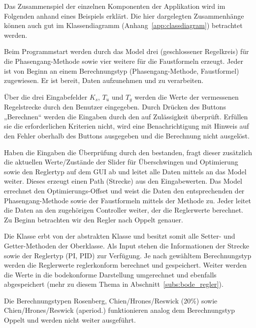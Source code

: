Das Zusammenspiel der einzelnen Komponenten  der Applikation wird im Folgenden
anhand  eines   Beispiels  erkl\"art. Die  hier   dargelegten  Zusammenh\"ange
k\"onnen   auch   gut   im   Klassendiagramm   (Anhang~\ref{app:classdiagram})
betrachtet werden.

Beim   Programmstart   werden   durch  das   Model   drei   
(geschlossener  Regelkreis) f\"ur  die Phasengang-Methode  sowie vier  weitere
f\"ur  die Faustformeln  erzeugt. Jeder   ist von  Beginn an
einem  Berechnungstyp  (Phasengang-Methode,  Faustformel)  zugewiesen. Er  ist
bereit, Daten aufzunehmen und zu verarbeiten.

\"Uber die  drei Eingabefelder  $K_s$, $T_u$  und $T_g$  werden die  Werte der
vermessenen Regelstrecke  durch den  Benutzer eingegeben. Durch  Dr\"ucken des
Buttons  „Berechnen“ werden  die Eingaben  durch den   auf
Zul\"assigkeit  \"uberpr\"uft. Erf\"ullen  sie  die  erforderlichen  Kriterien
nicht,  wird eine  Benachrichtigung mit  Hinweis auf  den Fehler  oberhalb des
Buttons ausgegeben und die Berechnung nicht ausgel\"ost.

Haben  die   Eingaben  die  \"Uberpr\"ufung  durch   den  
bestanden,  fragt  dieser  zus\"atzlich  die  aktuellen  Werte/Zust\"ande  der
Slider  f\"ur \"Uberschwingen  und  Optimierung sowie  den  Reglertyp auf  dem
GUI  ab  und   leitet  alle  Daten  mittels     an  das  Model
weiter. Dieses erzeugt  einen Path (Strecke) aus  den Eingabewerten. Das Model
errechnet  den  Optimierungs-Offset und  weist  die  Daten den  entsprechenden
 der  Phasengang-Methode sowie der Faustformeln  mittels der
Methode   zu. Jeder  leitet die  Daten an den
zugeh\"origen  Controller weiter,  der  die  Reglerwerte berechnet. Zu  Beginn
betrachten wir den Regler nach Oppelt genauer.

Die  Klasse   erbt  von der  abstrakten Klasse  
und  besitzt  somit  alle  Setter-  und  Getter-Methoden  der  Oberklasse. Als
Input  stehen die  Informationen der  Strecke  sowie der  Reglertyp (PI,  PID)
zur  Verf\"ugung. Je nach  gew\"ahltem Berechnungstyp  werden die  Reglerwerte
reglerkonform  berechnet  und  gespeichert. Weiter  werden die  Werte  in  die
bodekonforme  Darstellung umgerechnet  und  ebenfalls  abgespeichert (mehr  zu
diesem Thema in Abschnitt~\ref{subs:bode_regler}).

Die    Berechnungstypen   Rosenberg,    Chien/Hrones/Reswick   (20\%)    sowie
Chien/Hrones/Reswick (aperiod.) funktionieren analog dem Berechnungstyp Oppelt
und werden nicht weiter ausgef\"uhrt.

